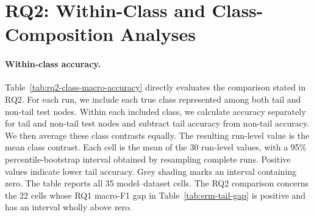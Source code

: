 \section{RQ2: Within-Class and Class-Composition Analyses}
\label{app:rq2-within-class}

\paragraph{Within-class accuracy.}
Table~\ref{tab:rq2-class-macro-accuracy} directly evaluates the comparison stated in RQ2. For each run, we include each true class represented among both tail and non-tail test nodes. Within each included class, we calculate accuracy separately for tail and non-tail test nodes and subtract tail accuracy from non-tail accuracy. We then average these class contrasts equally. The resulting run-level value is the mean class contrast.
Each cell is the mean of the 30 run-level values, with a 95\% percentile-bootstrap interval obtained by resampling complete runs. Positive values indicate lower tail accuracy. Grey shading marks an interval containing zero. The table reports all 35 model--dataset cells. The RQ2 comparison concerns the 22 cells whose RQ1 macro-F1 gap in Table~\ref{tab:erm-tail-gap} is positive and has an interval wholly above zero.

